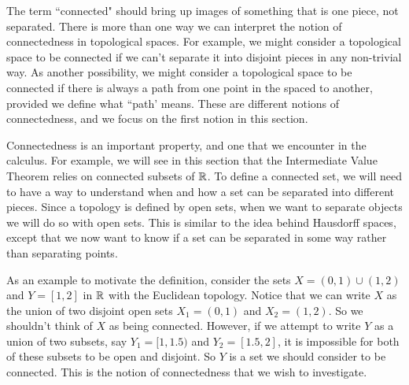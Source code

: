 \label{sec:Connected_topology}


\vspace*{-17 pt}

\vspace*{13 pt}


The term ``connected" should bring up images of something that is one piece, not separated. There is more than one way we can interpret the notion of connectedness in topological spaces. For example, we might consider a topological space to be connected if we can't separate it into disjoint pieces in any non-trivial way. As another possibility, we might consider a topological space to be connected if there is always a path from one point in the spaced to another, provided we define what ``path' means. These are different notions of connectedness, and we focus on the first notion in this section.

Connectedness is an important property, and one that we encounter in the calculus. For example, we will see in this section that the Intermediate Value Theorem relies on connected subsets of $\mathbb{R}$. To define a connected set, we will need to have a way to understand when and how a set can be separated into different pieces. Since a topology is defined by open sets, when we want to separate objects we will do so with open sets. This is similar to the idea behind Hausdorff spaces, except that we now want to know if a set can be separated in some way rather than separating points.

As an example to motivate the definition, consider the sets $X = (0,1) \cup (1,2)$ and $Y = [1,2]$ in $\mathbb{R}$ with the Euclidean topology. Notice that we can write $X$ as the union of two disjoint open sets $X_1 = (0,1)$ and $X_2 = (1,2)$. So we shouldn't think of $X$ as being connected. However, if we attempt to write $Y$ as a union of two subsets, say $Y_1 = [1,1.5)$ and $Y_2 = [1.5,2]$, it is impossible for both of these subsets to be open and disjoint. So $Y$ is a set we should consider to be connected. This is the notion of connectedness that we wish to investigate. 

